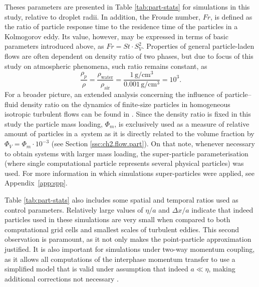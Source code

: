 \documentclass{pracamgren}
\begin{document}
Theses parameters are presented in Table \ref{tab:part-stats} for simulations in this study, relative to droplet radii.
In addition, the Froude number, $Fr$, is defined as the ratio of particle response time to the residence time of the particles in a Kolmogorov eddy.
Its value, however, may be expressed in terms of basic parameters introduced above, as $Fr = St \cdot S_V^2$.
Properties of general particle-laden flows are often dependent on density ratio of two phases, but due to focus of this study on atmospheric phenomena, such ratio remains constant, as
$$
\frac{\rho_p}{\rho} 
= \frac{\rho_{\text{water}}}{\rho_{\text{air}}} 
= \frac{1 \, \text{g} / \text{cm}^3}{0.001 \, \text{g} / \text{cm}^3} 
= 10^3 .
$$
For a broader picture, an extended analysis concerning the influence of particle–fluid density ratio on the dynamics of finite-size particles in homogeneous
isotropic turbulent flows can be found in \textcite{Shen2021}.
Since the density ratio is fixed in this study the particle mass loading, $\Phi_m$, is exclusively used as a measure of relative amount of particles in a~system as it is directly related to the volume fraction by $\Phi_V = \Phi_m \cdot 10^{-3}$ (see Section \ref{ssc:ch2.flow.part}).
On that note, whenever necessary to obtain systems with larger mass loading, the super-particle parameterisation (where single computational particle represents several physical particles) was used.
For more information in which simulations super-particles were applied, see Appendix~\ref{app:spp}. 

Table \ref{tab:part-stats} also includes some spatial and temporal ratios used as control parameters.
Relatively large values of $\eta / a$ and $\Delta x / a$ indicate that indeed particles used in these simulations are very small when compared to both computational grid cells and smallest scales of turbulent eddies.
This second observation is paramount, as it not only makes the point-particle approximation justified.
It is also important for simulations under two-way momentum coupling, as it allows all computations of the interphase momentum transfer to use a simplified model that is valid under assumption that indeed $a \ll \eta$, making additional corrections not necessary \parencite{Horwitz2016}.

\smallskip
\end{document}
